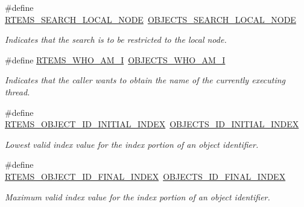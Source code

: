\begin{DoxyCompactItemize}
\#define \mbox{\hyperlink{group__RTEMSAPIClassic_gaedd0075c1a39a3deef1a1c224d6b8e17}{R\+T\+E\+M\+S\+\_\+\+S\+E\+A\+R\+C\+H\+\_\+\+L\+O\+C\+A\+L\+\_\+\+N\+O\+DE}}~\mbox{\hyperlink{group__RTEMSScoreObject_gaa5bb79abfd694f5145b9dc18dfc577d0}{O\+B\+J\+E\+C\+T\+S\+\_\+\+S\+E\+A\+R\+C\+H\+\_\+\+L\+O\+C\+A\+L\+\_\+\+N\+O\+DE}}
\begin{DoxyCompactList}\small\item\em Indicates that the search is to be restricted to the local node. \end{DoxyCompactList}\item 
\#define \mbox{\hyperlink{group__RTEMSAPIClassic_gaf2074f5738d942a95bc7c61658be80e4}{R\+T\+E\+M\+S\+\_\+\+W\+H\+O\+\_\+\+A\+M\+\_\+I}}~\mbox{\hyperlink{group__RTEMSScoreObject_ga6fd7ff36e6d951ff7cf435e9a7cdf359}{O\+B\+J\+E\+C\+T\+S\+\_\+\+W\+H\+O\+\_\+\+A\+M\+\_\+I}}
\begin{DoxyCompactList}\small\item\em Indicates that the caller wants to obtain the name of the currently executing thread. \end{DoxyCompactList}\item 
\mbox{\label{group__RTEMSAPIClassic_gad241f8ec3e29607b4cbccaef5f903025}} 
\#define \mbox{\hyperlink{group__RTEMSAPIClassic_gad241f8ec3e29607b4cbccaef5f903025}{R\+T\+E\+M\+S\+\_\+\+O\+B\+J\+E\+C\+T\+\_\+\+I\+D\+\_\+\+I\+N\+I\+T\+I\+A\+L\+\_\+\+I\+N\+D\+EX}}~\mbox{\hyperlink{group__RTEMSScoreObject_ga6aa91d4f58b2769c52ef2194fa6446e3}{O\+B\+J\+E\+C\+T\+S\+\_\+\+I\+D\+\_\+\+I\+N\+I\+T\+I\+A\+L\+\_\+\+I\+N\+D\+EX}}
\begin{DoxyCompactList}\small\item\em Lowest valid index value for the index portion of an object identifier. \end{DoxyCompactList}\item 
\mbox{\label{group__RTEMSAPIClassic_ga47f16ae5a6453cd1aa98727059d254ed}} 
\#define \mbox{\hyperlink{group__RTEMSAPIClassic_ga47f16ae5a6453cd1aa98727059d254ed}{R\+T\+E\+M\+S\+\_\+\+O\+B\+J\+E\+C\+T\+\_\+\+I\+D\+\_\+\+F\+I\+N\+A\+L\+\_\+\+I\+N\+D\+EX}}~\mbox{\hyperlink{group__RTEMSScoreObject_gadec3b3e06c06eaa198708069b727aa77}{O\+B\+J\+E\+C\+T\+S\+\_\+\+I\+D\+\_\+\+F\+I\+N\+A\+L\+\_\+\+I\+N\+D\+EX}}
\begin{DoxyCompactList}\small\item\em Maximum valid index value for the index portion of an object identifier. \end{DoxyCompactList}\item 

\end{DoxyCompactItemize}
